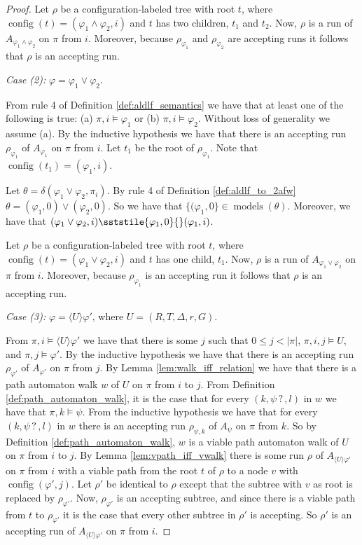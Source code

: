 \documentclass{lmcs}
\theoremstyle{definition}
\newcommand{\sderives}[1]{\sststile{#1}{}}
\newcommand{\dbox}[1]{\langle #1 \rangle}
\DeclareMathOperator{\config}{config}
\DeclareMathOperator{\?}{?}
\DeclareMathOperator{\mymodels}{models}
\begin{document}
\begin{proof}
    Let $\rho$ be a configuration-labeled tree with root $t$, where $\config(t) = (\varphi_1 \wedge \varphi_2,i)$
    and $t$ has two children, $t_1$ and $t_2$. Now, $\rho$ is a run of $A_{\varphi_1 \wedge \varphi_2}$ on $\pi$ from $i$.
    Moreover, because $\rho_{\varphi_1}$ and $\rho_{\varphi_2}$ are accepting runs it follows that $\rho$ is an accepting run.


    \textit{Case (2):} $\varphi = \varphi_1 \vee \varphi_2$.

    From rule 4 of Definition \ref{def:aldlf_semantics} we have that at least one of the following is true: (a) $\pi,i \models \varphi_1$
    or (b) $\pi,i \models \varphi_2$. Without loss of generality we assume (a). By the inductive hypothesis we have that there is
    an accepting run $\rho_{\varphi_1}$ of $A_{\varphi_1}$ on $\pi$ from $i$. Let $t_1$ be the root of $\rho_{\varphi_1}$. Note that
    $\config(t_1) = (\varphi_1,i)$.

    Let $\theta = \delta(\varphi_1 \vee \varphi_2,\pi_i)$. By rule 4 of Definition \ref{def:aldlf_to_2afw}
    $\theta = (\varphi_1,0) \vee (\varphi_2,0)$.
    So we have that $\{(\varphi_1,0 \} \in \mymodels(\theta)$. Moreover, we have that
    $(\varphi_1 \vee \varphi_2,i) \sderives{\varphi_1,0} (\varphi_1,i)$.

    Let $\rho$ be a configuration-labeled tree with root $t$, where $\config(t) = (\varphi_1 \vee \varphi_2,i)$
    and $t$ has one child, $t_1$. Now, $\rho$ is a run of $A_{\varphi_1 \vee \varphi_2}$ on $\pi$ from $i$.
    Moreover, because $\rho_{\varphi_1}$ is an accepting run it follows that $\rho$ is an accepting run.


    \textit{Case (3):} $\varphi = \dbox{U}\varphi'$, where $U = (R,T,\Delta,r,G)$.

    From $\pi,i \models \dbox{U}\varphi'$ we have that there is some $j$ such that $0 \leq j < |\pi|$,
    $\pi,i,j \models U$, and $\pi,j \models \varphi'$. By the inductive hypothesis we have that there is an accepting run
    $\rho_{\varphi'}$ of $A_{\varphi'}$ on $\pi$ from $j$.
    By Lemma \ref{lem:walk_iff_relation} we have that there is a path automaton walk $w$ of $U$ on
    $\pi$ from $i$ to $j$. From Definition \ref{def:path_automaton_walk}, it is the case that for every $(k, \psi \? ,l)$ in $w$ we have that $\pi,k \models \psi$.
    From the inductive hypothesis we have that for every $(k, \psi \? ,l)$ in $w$ there is an accepting run $\rho_{\psi,k}$ of $A_\psi$ on
    $\pi$ from $k$. So by Definition \ref{def:path_automaton_walk}, $w$ is a viable path automaton walk of $U$ on $\pi$ from $i$ to $j$.
    By Lemma \ref{lem:vpath_iff_vwalk}
    there is some run $\rho$ of $A_{\dbox{U}\varphi'}$ on $\pi$ from $i$ with a viable path from the root $t$ of $\rho$ to a node
    $v$ with $\config(\varphi',j)$. Let $\rho'$ be identical to $\rho$ except that the subtree with $v$ as root is replaced by
    $\rho_{\varphi'}$. Now, $\rho_{\varphi'}$ is an accepting subtree, and since there is a viable path from $t$ to $\rho_{\varphi'}$
    it is the case that every other subtree in $\rho'$ is accepting. So $\rho'$ is an accepting run of $A_{\dbox{U}\varphi'}$ on $\pi$ from $i$.


\end{proof}
\end{document}
